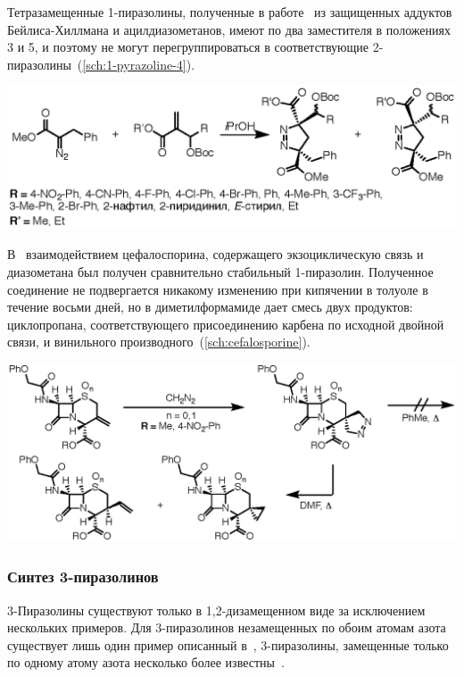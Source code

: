 Тетразамещенные 1-пиразолины, полученные в работе~\cite{Sun2013} из защищенных аддуктов Бейлиса-Хиллмана и ацилдиазометанов, имеют по два заместителя в положениях 3 и 5, и поэтому не могут перегруппироваться в соответствующие 2-пиразолины~(\ref{sch:1-pyrazoline-4}).

\begin{scheme}[h!]
    \centering
    \includegraphics{sections/literature/img/1-pyrazoline-4.eps}
    \caption{}
    \label{sch:1-pyrazoline-4}
\end{scheme}

В~\cite{Baldwin1990} взаимодействием цефалоспорина, содержащего экзоциклическую связь и диазометана был получен сравнительно стабильный 1-пиразолин.
Полученное соединение не подвергается никакому изменению при кипячении в толуоле в течение восьми дней, но в диметилформамиде дает смесь двух продуктов: циклопропана, соответствующего присоединению карбена по исходной двойной связи, и винильного производного~(\ref{sch:cefalosporine}).

\begin{scheme}[h!]
    \centering
    \includegraphics{sections/literature/img/cefalosporine.eps}
    \caption{}
    \label{sch:cefalosporine}
\end{scheme}
\FloatBarrier{}


\subsubsection{Синтез 3-пиразолинов}
3-Пиразолины существуют только в 1,2-дизамещенном виде за исключением нескольких примеров.
Для 3-пиразолинов незамещенных по обоим атомам азота существует лишь один пример описанный в~\cite{Misani1956}, 3-пиразолины, замещенные только по одному атому азота несколько более известны~\cite{Takamizawa1963, Takamizawa1965, Armstrong1973, Burger1979}.

